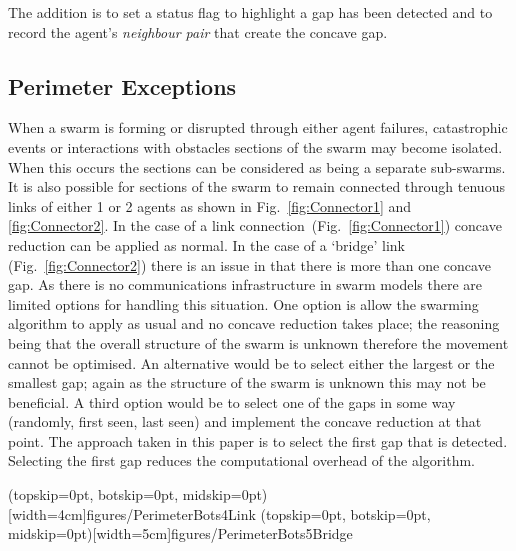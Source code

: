 \documentclass{ieeeaccess}
\begin{document}
The addition is to set a status flag to highlight a gap has been detected and to record the agent's \textit{neighbour pair} that create the concave gap.

\subsection{Perimeter Exceptions}\label{concave:Exceptions}
When a swarm is forming or disrupted through either agent failures, catastrophic events or interactions with obstacles sections of the swarm may become isolated. When this occurs the sections can be considered as being a separate sub-swarms. It is also possible for sections of the swarm to remain connected through tenuous links of either 1 or 2 agents as shown in Fig.~\ref{fig:Connector1} and \ref{fig:Connector2}. In the case of a link connection~(Fig.~\ref{fig:Connector1}) concave reduction can be applied as normal. In the case of a `bridge' link (Fig.~\ref{fig:Connector2}) there is an issue in that there is more than one concave gap. As there is no communications infrastructure in swarm models there are limited options for handling this situation. One option is allow the swarming algorithm to apply as usual and no concave reduction takes place; the reasoning being that the overall structure of the swarm is unknown therefore the movement cannot be optimised. An alternative would be to select either the largest or the smallest gap; again as the structure of the swarm is unknown this may not be beneficial. A third option would be to select one of the gaps in some way (randomly, first seen, last seen) and implement the concave reduction at that point. The approach taken in this paper is to select the first gap that is detected. Selecting the first gap reduces the computational overhead of the algorithm.

\Figure[t!](topskip=0pt, botskip=0pt, midskip=0pt)[width=4cm]{figures/PerimeterBots4}{Link\label{fig:Connector1}}
\Figure[t!](topskip=0pt, botskip=0pt, midskip=0pt)[width=5cm]{figures/PerimeterBots5}{Bridge\label{fig:Connector2}}
\end{document}
